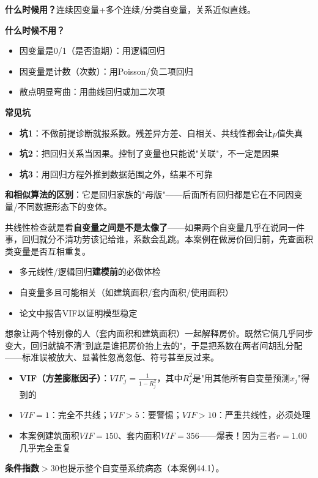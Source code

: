 \begin{algonotes}
\textbf{什么时候用？}连续因变量+多个连续/分类自变量，关系近似直线。

\textbf{什么时候不用？}
\begin{itemize}
    \item 因变量是0/1（是否逾期）：用逻辑回归
    \item 因变量是计数（次数）：用Poisson/负二项回归
    \item 散点明显弯曲：用曲线回归或加二次项
\end{itemize}

\textbf{常见坑}
\begin{itemize}
    \item \textbf{坑1}：不做前提诊断就报系数。残差异方差、自相关、共线性都会让$p$值失真
    \item \textbf{坑2}：把回归关系当因果。控制了变量也只能说"关联"，不一定是因果
    \item \textbf{坑3}：用回归方程外推到数据范围之外，结果不可靠
\end{itemize}

\textbf{和相似算法的区别}：它是回归家族的"母版"——后面所有回归都是它在不同因变量/不同数据形态下的变体。
\end{algonotes}


\begin{algointro}
共线性检查就是看\textbf{自变量之间是不是太像了}——如果两个自变量几乎在说同一件事，回归就分不清功劳该记给谁，系数会乱跳。本案例在做房价回归前，先查面积类变量是否互相重复。
\end{algointro}

\begin{algoscene}
\begin{itemize}
    \item 多元线性/逻辑回归\textbf{建模前}的必做体检
    \item 自变量多且可能相关（如建筑面积/套内面积/使用面积）
    \item 论文中报告VIF以证明模型稳定
\end{itemize}
\end{algoscene}

\begin{algoprinciple}
想象让两个特别像的人（套内面积和建筑面积）一起解释房价。既然它俩几乎同步变大，回归就搞不清"到底是谁把房价抬上去的"，于是把系数在两者间胡乱分配——标准误被放大、显著性忽高忽低、符号甚至反过来。

\begin{itemize}
    \item \textbf{VIF（方差膨胀因子）}：$VIF_j=\frac{1}{1-R_j^2}$，其中$R_j^2$是"用其他所有自变量预测$x_j$"得到的
    \item $VIF=1$：完全不共线；$VIF>5$：要警惕；$VIF>10$：严重共线性，必须处理
    \item 本案例建筑面积$VIF=150$、套内面积$VIF=356$——爆表！因为三者$r=1.00$几乎完全重复
\end{itemize}

\textbf{条件指数}$>30$也提示整个自变量系统病态（本案例44.1）。
\end{algoprinciple}

